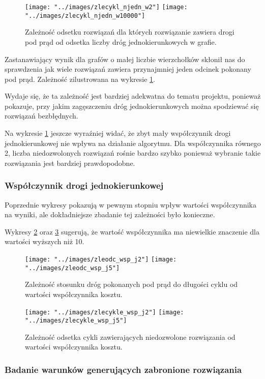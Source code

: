 \documentclass{article}
\begin{document}
\begin{figure}
\texttt{[image: "../images/zlecykl\_njedn\_w2"]}
\texttt{[image: "../images/zlecykl\_njedn\_w10000"]}
\caption{Zależność odsetku rozwiązań dla których rozwiązanie zawiera drogi pod prąd od odsetka liczby dróg jednokierunkowych w grafie.}
\label{fig_cykle_jednokier}
\end{figure}

Zastanawiający wynik dla grafów o małej liczbie wierzchołków skłonił nas do sprawdzenia jak wiele rozwiązań zawiera przynajmniej jeden odcinek pokonany pod prąd. Zależność zilustrowana na wykresie \ref{fig_cykle_jednokier}.

Wydaje się, że ta zależność jest bardziej adekwatna do tematu projektu, ponieważ pokazuje, przy jakim zagęszczeniu dróg jednokierunkowych można spodziewać się rozwiązań bezbłędnych.

Na wykresie \ref{fig_cykle_jednokier} jeszcze wyraźniej widać, że zbyt mały współczynnik drogi jednokierunkowej nie wpływa na działanie algorytmu. Dla współczynnika równego 2, liczba niedozwolonych rozwiązań rośnie bardzo szybko ponieważ wybranie takie rozwiązania jest bardziej prawdopodobne.

\subsubsection{Współczynnik drogi jednokierunkowej}

Poprzednie wykresy pokazują w pewnym stopniu wpływ wartości współczynnika na wyniki, ale dokładniejsze zbadanie tej zależności było konieczne.

Wykresy \ref{fig_odc_wsp} oraz \ref{fig_cykle_wsp} sugerują, że wartość współczynnika ma niewielkie znaczenie dla wartości wyższych niż 10.

\begin{figure}
\texttt{[image: "../images/zleodc\_wsp\_j2"]}
\texttt{[image: "../images/zleodc\_wsp\_j5"]}
\caption{Zależność stosunku dróg pokonanych pod prąd do długości cyklu od wartości współczynnika kosztu.}
\label{fig_odc_wsp}
\end{figure}

\begin{figure}
\texttt{[image: "../images/zlecykle\_wsp\_j2"]}
\texttt{[image: "../images/zlecykle\_wsp\_j5"]}
\caption{Zależność odsetka cykli zawierających niedozwolone rozwiązania od wartości współczynnika kosztu.}
\label{fig_cykle_wsp}
\end{figure}

\subsubsection{Badanie warunków generujących zabronione rozwiązania}
\end{document}

